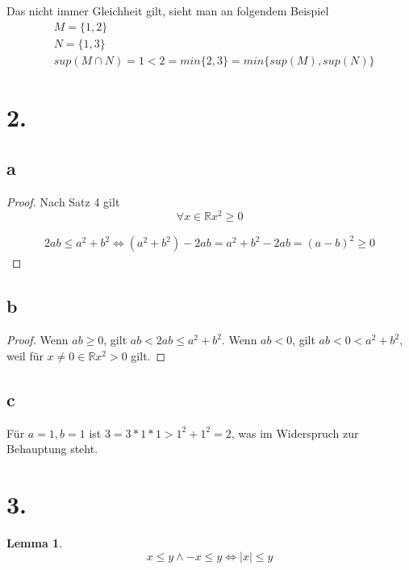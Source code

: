 \documentclass[a4paper,10pt]{article}
\newtheorem*{lemma}{Lemma}
\begin{document}
Das nicht immer Gleichheit gilt, sieht man an folgendem Beispiel
\begin{align*}
 & M = \{1, 2\}\\
 & N = \{1, 3\}\\
 & sup(M \cap N) = 1 < 2 = min \{2, 3\} = min \{sup(M), sup(N)\}
\end{align*}

\section*{2.}

\subsection*{a}

\begin{proof}
 Nach Satz 4 gilt
 \begin{equation*}
  \forall x \in \mathbb{R} x^2 \ge 0
 \end{equation*}

 \begin{align*}
  2ab \le a^2 + b^2 \Leftrightarrow (a^2 + b^2) - 2ab = a^2 + b^2 - 2ab = (a - b)^2 \ge 0
 \end{align*}
\end{proof}

\subsection*{b}

\begin{proof}
 Wenn $ab \ge 0$, gilt $ab < 2ab \le a^2 + b^2$.
 Wenn $ab < 0$, gilt $ab < 0 < a^2 + b^2$, weil für $x \ne 0 \in \mathbb{R} x^2 > 0$ gilt.
\end{proof}

\subsection*{c}

Für $a = 1, b = 1$ ist $3 = 3 * 1 * 1 > 1^2 + 1^2 = 2$, was im Widerspruch zur Behauptung steht.

\section*{3.}

\begin{lemma}
 \begin{equation*}
  x \le y \land -x \le y \Leftrightarrow |x| \le y
 \end{equation*}
\end{lemma}
\end{document}
